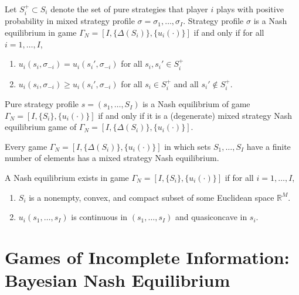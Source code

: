 \begin{prop}
    Let $S_i^+ \subset S_i$ denote the set of pure strategies that player $i$ plays with positive probability in mixed strategy profile $\sigma = \sigma_1, \dots, \sigma_I$. Strategy profile $\sigma$ is a Nash equilibrium in game $\Gamma_N = [I, \{\Delta(S_i)\}, \{u_i(\cdot)\}]$ if and only if for all $i = 1, \dots, I$,
    \begin{enumerate}
        \item $u_i (s_i, \sigma_{-i}) = u_i (s_i', \sigma_{-i})$ for all $s_i, s_i' \in S_i^+$
        \item $u_i (s_i, \sigma_{-i}) \geq u_i (s_i', \sigma_{-i})$ for all $s_i \in S_i^+$ and all $s_i' \not\in S_i^+$.
    \end{enumerate}
\end{prop}

\begin{cor}
    Pure strategy profile $s = (s_1, \dots, S_I)$ is a Nash equilibrium of game $\Gamma_N = [I, \{S_i\}, \{u_i(\cdot)\}]$ if and only if it is a (degenerate) mixed strategy Nash equilibrium game of $\Gamma_N = [I, \{\Delta(S_i)\}, \{u_i(\cdot)\}]$.
\end{cor}

\begin{prop}
    Every game $\Gamma_N = [I, \{\Delta(S_i)\}, \{u_i(\cdot)\}]$ in which sets $S_1, \dots, S_I$ have a finite number of elements has a mixed strategy Nash equilibrium.
\end{prop}

\begin{prop}
    A Nash equilibrium exists in game $\Gamma_N = [I, \{S_i\}, \{u_i(\cdot)\}]$ if for all $i = 1, \dots, I$,
    \begin{enumerate}
        \item $S_i$ is a nonempty, convex, and compact subset of some Euclidean space $\mathbb{R}^M$.
        \item $u_i (s_1, \dots, s_I)$ is continuous in $(s_1, \dots, s_I)$ and quasiconcave in $s_i$.
    \end{enumerate}
\end{prop}


\section{Games of Incomplete Information: Bayesian Nash Equilibrium}

